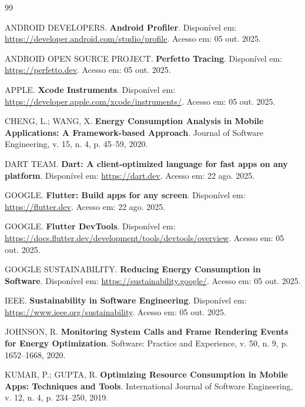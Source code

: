 \documentclass[12pt,a4paper,oneside]{abntex2}
\begin{document}
\renewcommand{\refname}{Referências}
\begin{thebibliography}{99}

ANDROID DEVELOPERS. \textbf{Android Profiler}. Disponível em: \url{https://developer.android.com/studio/profile}. Acesso em: 05 out. 2025.

ANDROID OPEN SOURCE PROJECT. \textbf{Perfetto Tracing}. Disponível em: \url{https://perfetto.dev}. Acesso em: 05 out. 2025.

APPLE. \textbf{Xcode Instruments}. Disponível em: \url{https://developer.apple.com/xcode/instruments/}. Acesso em: 05 out. 2025.

CHENG, L.; WANG, X. \textbf{Energy Consumption Analysis in Mobile Applications: A Framework-based Approach}. Journal of Software Engineering, v. 15, n. 4, p. 45–59, 2020.

DART TEAM. \textbf{Dart: A client-optimized language for fast apps on any platform}. Disponível em: \url{https://dart.dev}. Acesso em: 22 ago. 2025.

GOOGLE. \textbf{Flutter: Build apps for any screen}. Disponível em: \url{https://flutter.dev}. Acesso em: 22 ago. 2025.

GOOGLE. \textbf{Flutter DevTools}. Disponível em: \url{https://docs.flutter.dev/development/tools/devtools/overview}. Acesso em: 05 out. 2025.

GOOGLE SUSTAINABILITY. \textbf{Reducing Energy Consumption in Software}. Disponível em: \url{https://sustainability.google/}. Acesso em: 05 out. 2025.

IEEE. \textbf{Sustainability in Software Engineering}. Disponível em: \url{https://www.ieee.org/sustainability}. Acesso em: 05 out. 2025.

JOHNSON, R. \textbf{Monitoring System Calls and Frame Rendering Events for Energy Optimization}. Software: Practice and Experience, v. 50, n. 9, p. 1652–1668, 2020.

KUMAR, P.; GUPTA, R. \textbf{Optimizing Resource Consumption in Mobile Apps: Techniques and Tools}. International Journal of Software Engineering, v. 12, n. 4, p. 234–250, 2019.


\end{thebibliography}
\end{document}

